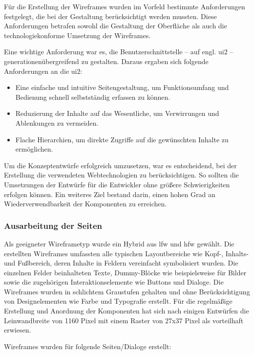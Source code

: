Für die Erstellung der Wireframes wurden im Vorfeld bestimmte Anforderungen festgelegt, die bei der Gestaltung berücksichtigt werden mussten. Diese Anforderungen betrafen sowohl die Gestaltung der Oberfläche als auch die technologiekonforme Umsetzung der Wireframes.

Eine wichtige Anforderung war es, die Benutzerschnittstelle -- auf engl. \acrfull{ui2} -- generationenübergreifend zu gestalten. Daraus ergaben sich folgende Anforderungen an die \acrshort{ui2}:

\begin{itemize}
    \item Eine einfache und intuitive Seitengestaltung, um Funktionsumfang und Bedienung schnell selbstständig erfassen zu können.
    \item Reduzierung der Inhalte auf das Wesentliche, um Verwirrungen und Ablenkungen zu vermeiden.
    \item Flache Hierarchien, um direkte Zugriffe auf die gewünschten Inhalte zu ermöglichen.
\end{itemize}

Um die Konzeptentwürfe erfolgreich umzusetzen, war es entscheidend, bei der Erstellung die verwendeten Webtechnologien zu berücksichtigen. So sollten die Umsetzungen der Entwürfe für die Entwickler ohne größere Schwierigkeiten erfolgen können. Ein weiteres Ziel bestand darin, einen hohen Grad an Wiederverwendbarkeit der Komponenten zu erreichen.

\subsubsection{Ausarbeitung der Seiten}

Als geeigneter Wireframetyp wurde ein Hybrid aus \acrshort{lfw} und \acrshort{hfw} gewählt. Die erstellten Wireframes umfassten alle typischen Layoutbereiche wie Kopf-, Inhalts- und Fußbereich, deren Inhalte in Feldern vereinfacht symbolisiert wurden. Die einzelnen Felder beinhalteten Texte, Dummy-Blöcke wie beispielsweise für Bilder sowie die zugehörigen Interaktionselemente wie Buttons und Dialoge.
Die Wireframes wurden in schlichtem Graustufen gehalten und ohne Berücksichtigung von Designelementen wie Farbe und Typografie erstellt. Für die regelmäßige Erstellung und Anordnung der Komponenten hat sich nach einigen Entwürfen die Leinwandbreite von 1160 Pixel mit einem Raster von 27x37 Pixel als vorteilhaft erwiesen.


Wireframes wurden für folgende Seiten/Dialoge erstellt:

